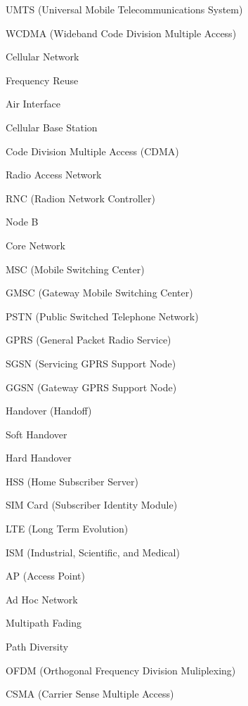 \filbreak
\vskip 3mm
UMTS (Universal Mobile Telecommunications System)

\filbreak
\vskip 3mm
WCDMA (Wideband Code Division Multiple Access)

\filbreak
\vskip 3mm
Cellular Network

\filbreak
\vskip 3mm
Frequency Reuse

\filbreak
\vskip 3mm
Air Interface

\filbreak
\vskip 3mm
Cellular Base Station

\filbreak
\vskip 3mm
Code Division Multiple Access (CDMA)

\filbreak
\vskip 3mm
Radio Access Network

\filbreak
\vskip 3mm
RNC (Radion Network Controller)

\filbreak
\vskip 3mm
Node B

\filbreak
\vskip 3mm
Core Network

\filbreak
\vskip 3mm
MSC (Mobile Switching Center)

\filbreak
\vskip 3mm
GMSC (Gateway Mobile Switching Center)

\filbreak
\vskip 3mm
PSTN (Public Switched Telephone Network)

\filbreak
\vskip 3mm
GPRS (General Packet Radio Service)

\filbreak
\vskip 3mm
SGSN (Servicing GPRS Support Node)

\filbreak
\vskip 3mm
GGSN (Gateway GPRS Support Node)

\filbreak
\vskip 3mm
Handover (Handoff)

\filbreak
\vskip 3mm
Soft Handover

\filbreak
\vskip 3mm
Hard Handover

\filbreak
\vskip 3mm
HSS (Home Subscriber Server)

\filbreak
\vskip 3mm
SIM Card (Subscriber Identity Module)

\filbreak
\vskip 3mm
LTE (Long Term Evolution)

\filbreak
\vskip 3mm
ISM (Industrial, Scientific, and Medical)

\filbreak
\vskip 3mm
AP (Access Point)

\filbreak
\vskip 3mm
Ad Hoc Network

\filbreak
\vskip 3mm
Multipath Fading

\filbreak
\vskip 3mm
Path Diversity

\filbreak
\vskip 3mm
OFDM (Orthogonal Frequency Division Muliplexing)

\filbreak
\vskip 3mm
CSMA (Carrier Sense Multiple Access)

